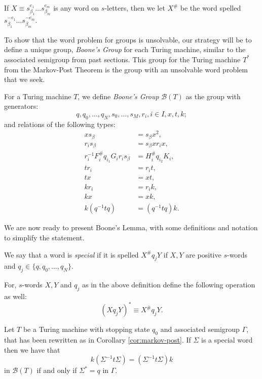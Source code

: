 If $X \equiv s_{\beta_1}^{e_1} \dots s_{\beta_m}^{e_m}$ is any word on $s$-letters, then we let $X^{\#}$ be the word spelled $s_{\beta_1}^{-e_1} \dots s_{\beta_m}^{-e_m}$.

To show that the word problem for groups is unsolvable, our strategy will be to define a unique group, \emph{Boone's Group} for each Turing machine, similar to the associated semigroup from past sections.  This group for the Turing machine $T^*$ from the Markov-Post Theorem is the group with an unsolvable word problem that we seek.

\begin{definition}
  For a Turing machine $T$, we define \emph{Boone's Group} $\mathcal{B}(T)$ as the group with generators:
  \begin{equation*}
    q,q_0, \dots, q_N, s_0, \dots, s_M, r_i, i \in I,x,t,k;
  \end{equation*}
  and relations of the following types:
  \begin{align*}
    xs_\beta &= s_\beta x^2, \\
    r_is_\beta &= s_\beta xr_ix, \\
    r_i^{-1}F_i^{\#}q_{i_1}G_ir_is_\beta &= H_i^{\#}q_{i_2}K_i, \\
    tr_i &= r_it, \\
    tx &= xt, \\
    kr_i &= r_ik, \\
    kx &= xk, \\
    k(q^{-1}tq) &= (q^{-1}tq)k.    
  \end{align*}
\end{definition}

We are now ready to present Boone's Lemma, with some definitions and notation to simplify the statement.

\begin{definition}
  We say that a word is \emph{special} if it is spelled $X^{\#}q_jY$ if $X,Y$ are positive $s$-words and $q_j \in \{q,q_0,\dots,q_N\}$.
\end{definition}

For, $s$-words $X,Y$ and $q_j$ as in the above definition define the following operation as well:
\begin{equation*}
  (Xq_jY)^* \equiv X^{\#}q_jY.
\end{equation*}

\begin{lemma}[Boone]
  Let $T$ be a Turing machine with stopping state $q_0$ and associated semigroup $\Gamma$, that has been rewritten as in Corollary \ref{cor:markov-post}. If $\Sigma$ is a special word then we have that
  \begin{equation*}
    k(\Sigma^{-1}t\Sigma) = (\Sigma^{-1}t \Sigma)k
  \end{equation*}
  in $\mathcal{B}(T)$ if and only if $\Sigma^* = q$ in $\Gamma$.
\end{lemma}

